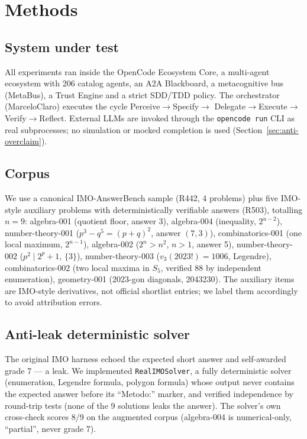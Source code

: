 \section{Methods}
\label{sec:methods}

\subsection{System under test}
\label{sec:system}
All experiments ran inside the OpenCode Ecosystem Core, a multi-agent
ecosystem with 206 catalog agents, an A2A Blackboard, a metacognitive bus
(MetaBus), a Trust Engine and a strict SDD/TDD policy. The orchestrator
(MarceloClaro) executes the cycle Perceive$\rightarrow$Specify$\rightarrow$
Delegate$\rightarrow$Execute$\rightarrow$Verify$\rightarrow$Reflect. External
LLMs are invoked through the \texttt{opencode run} CLI as real subprocesses;
no simulation or mocked completion is used (Section~\ref{sec:anti-overclaim}).

\subsection{Corpus}
\label{sec:corpus}
We use a canonical IMO-AnswerBench sample (R442, 4 problems) plus five
IMO-style auxiliary problems with deterministically verifiable answers
(R503), totalling $n=9$: algebra-001 (quotient floor, answer 3),
algebra-004 (inequality, $2^{u-2}$), number-theory-001 ($p^3-q^5=(p+q)^2$,
answer $(7,3)$), combinatorics-001 (one local maximum, $2^{n-1}$),
algebra-002 ($2^n>n^2$, $n>1$, answer 5), number-theory-002 ($p^2 \mid 2^p+1$,
$\{3\}$), number-theory-003 ($v_3(2023!)=1006$, Legendre), combinatorics-002
(two local maxima in $S_5$, verified 88 by independent enumeration),
geometry-001 (2023-gon diagonals, 2043230). The auxiliary items are
IMO-style derivatives, not official shortlist entries; we label them
accordingly to avoid attribution errors.

\subsection{Anti-leak deterministic solver}
\label{sec:solver}
The original IMO harness \citep{imo_harness_local} echoed the expected
short answer and self-awarded grade 7 --- a leak. We implemented
\texttt{RealIMOSolver}, a fully deterministic solver (enumeration, Legendre
formula, polygon formula) whose output never contains the expected answer
before its ``Metodo:'' marker, and verified independence by round-trip tests
(none of the 9 solutions leaks the answer). The solver's own cross-check
scores 8/9 on the augmented corpus (algebra-004 is numerical-only,
``partial'', never grade 7).

